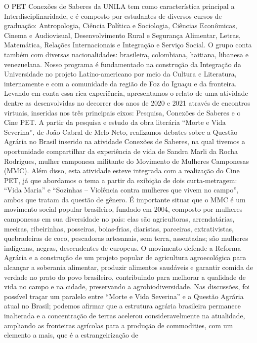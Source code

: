 O PET Conexões de Saberes da UNILA tem como característica principal a 
Interdisciplinaridade, e é composto por estudantes de diversos cursos de graduação: Antropologia, 
Ciência Política e Sociologia, Ciências Econômicas, Cinema e Audiovisual, Desenvolvimento 
Rural e Segurança Alimentar, Letras, Matemática, Relações Internacionais e Integração e Serviço 
Social. O grupo conta também com diversas nacionalidades: brasileira, colombiana, haitiana, 
libanesa e venezuelana. Nosso programa é fundamentado na construção da Integração da 
Universidade no projeto Latino-americano por meio da Cultura e Literatura, internamente e com 
a comunidade da região de Foz do Iguaçu e da fronteira. Levando em conta essa rica experiência, 
apresentamos o relato de uma atividade dentre as desenvolvidas no decorrer dos anos de 2020 e 
2021 através de encontros virtuais, inseridas nos três principais eixos: Pesquisa, Conexões de 
Saberes e o Cine PET.
A partir da pesquisa e estudo da obra literária “Morte e Vida Severina”, de João Cabral de 
Melo Neto, realizamos debates sobre a Questão Agrária no Brasil inserido na atividade Conexões 
de Saberes, na qual tivemos a oportunidade compartilhar da experiência de vida de Sandra Marli 
da Rocha Rodrigues, mulher camponesa militante do Movimento de Mulheres Camponesas 
(MMC). Além disso, esta atividade esteve integrada com a realização do Cine PET, já que 
abordamos o tema a partir da exibição de dois curta-metragem: “Vida Maria” e “Sozinhas –
Violência contra mulheres que vivem no campo”, ambos que tratam da questão de gênero.
É importante situar que o MMC é um movimento social popular brasileiro, fundado em 
2004, composto por mulheres camponesas em sua diversidade no país: elas são agricultoras, 
arrendatárias, meeiras, ribeirinhas, posseiras, boias-frias, diaristas, parceiras, extrativistas, 
quebradeiras de coco, pescadoras artesanais, sem terra, assentadas; são mulheres indígenas, negras, 
descendentes de europeus. O movimento defende a Reforma Agrária e a construção de um projeto 
popular de agricultura agroecológica para alcançar a soberania alimentar, produzir alimentos 
saudáveis e garantir comida de verdade no prato do povo brasileiro, contribuindo para melhorar a 
qualidade de vida no campo e na cidade, preservando a agrobiodiversidade.
Nas discussões, foi possível traçar um paralelo entre “Morte e Vida Severina” e a Questão 
Agrária atual no Brasil; podemos afirmar que a estrutura agrária brasileira permanece inalterada e 
a concentração de terras acelerou consideravelmente na atualidade, ampliando as fronteiras 
agrícolas para a produção de commodities, com um elemento a mais, que é a estrangeirização de 
